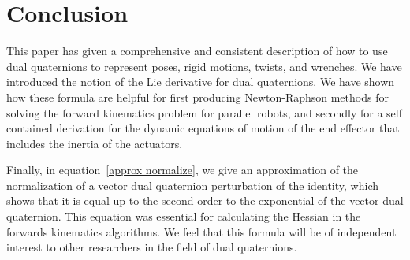 \documentclass[reqno,12pt]{amsart}
\begin{document}
\section{Conclusion}

This paper has given a comprehensive and consistent description of how to use dual quaternions to represent poses, rigid motions, twists, and wrenches.  We have introduced the notion of the Lie derivative for dual quaternions.  We have shown how these formula are helpful for first producing Newton-Raphson methods for solving the forward kinematics problem for parallel robots, and secondly for a self contained derivation for the dynamic equations of motion of the end effector that includes the inertia of the actuators.

Finally, in equation~\eqref{approx normalize}, we give an approximation of the normalization of a vector dual quaternion perturbation of the identity, which shows that it is equal up to the second order to the exponential of the vector dual quaternion.  This equation was essential for calculating the Hessian in the forwards kinematics algorithms.  We feel that this formula will be of independent interest to other researchers in the field of dual quaternions.
\end{document}
